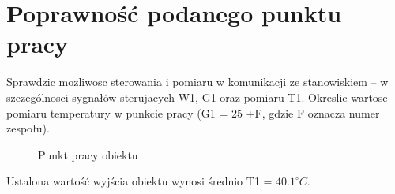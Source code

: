 \section{Poprawność podanego punktu pracy}
\label{lab:zad1}

Sprawdzic mozliwosc sterowania i pomiaru w komunikacji ze stanowiskiem – w szczególnosci
sygnałów sterujacych W1, G1 oraz pomiaru T1. Okreslic wartosc pomiaru
temperatury w punkcie pracy (G1 = 25 +F, gdzie F oznacza numer zespołu).


\begin{figure}[H] 
   \centering
   
   \caption{Punkt pracy obiektu}
   \label{lab:zad1:figure}
\end{figure}

Ustalona wartość wyjścia obiektu wynosi średnio T1 = $\num{40.1}^{\circ} C$.

\newpage
